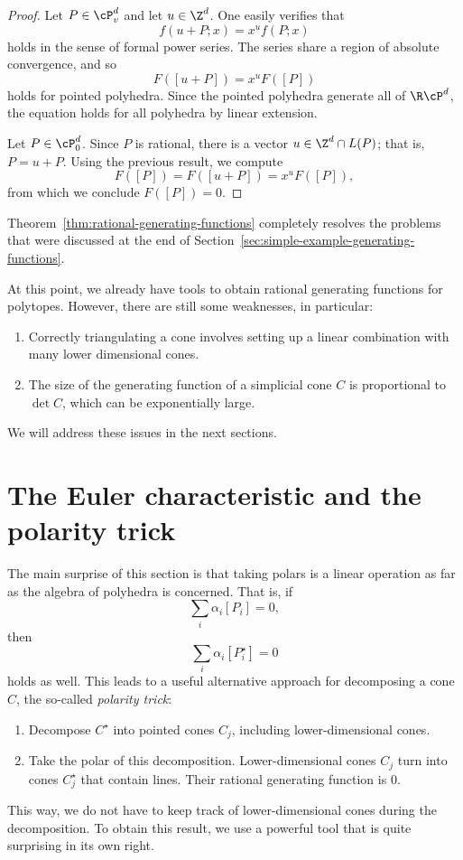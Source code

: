 \begin{proof}
  Let $P \in \cP_v^d$ and let $u \in \Z^d$.
  One easily verifies that
  \[
    f(u+P;x) = x^u f(P;x)
  \]
  holds in the sense of formal power series.
  The series share a region of absolute convergence, and so
  \[
    F([u + P]) = x^u F([P])
  \]
  holds for pointed polyhedra.
  Since the pointed polyhedra generate all of $\R\cP^d$,
  the equation holds for all polyhedra by linear extension.

  Let $P \in \cP_0^d$. Since $P$ is rational, there is a vector $u \in \Z^d \cap L(P)$; that is, $P = u + P$.
  Using the previous result, we compute
  \[
    F([P]) = F([u + P]) = x^u F([P]),
  \]
  from which we conclude $F([P]) = 0$.
\end{proof}

Theorem~\ref{thm:rational-generating-functions} completely resolves
the problems that were discussed at the end of Section~\ref{sec:simple-example-generating-functions}.

At this point, we already have tools to obtain rational generating functions for polytopes.
However, there are still some weaknesses, in particular:
\begin{enumerate}
  \item Correctly triangulating a cone involves setting up a linear combination with many lower dimensional cones.

  \item The size of the generating function of a simplicial cone $C$ is proportional to $\det C$,
    which can be exponentially large.
\end{enumerate}
We will address these issues in the next sections.




\section{The Euler characteristic and the polarity trick}

The main surprise of this section is that taking polars is a linear operation
as far as the algebra of polyhedra is concerned.
That is, if
\[
  \sum_i \alpha_i [P_i] = 0,
\]
then
\[
  \sum_i \alpha_i [P_i^\star] = 0
\]
holds as well.
This leads to a useful alternative approach for decomposing a cone $C$,
the so-called \emph{polarity trick}:
\begin{enumerate}
  \item Decompose $C^\star$ into pointed cones $C_j$, including lower-dimensional cones.

  \item Take the polar of this decomposition.
    Lower-dimensional cones $C_j$ turn into cones $C_j^\star$ that contain lines.
    Their rational generating function is $0$.
\end{enumerate}
This way, we do not have to keep track of lower-dimensional cones during the decomposition.
To obtain this result, we use a powerful tool that is quite surprising in its own right.

